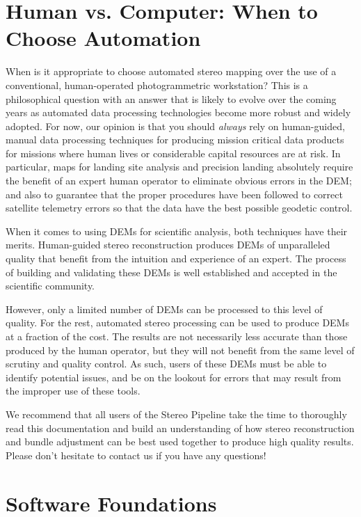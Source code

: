 \section{Human vs. Computer: When to Choose Automation}

When is it appropriate to choose automated stereo mapping over the use
of a conventional, human-operated photogrammetric workstation?  This
is a philosophical question with an answer that is likely to evolve
over the coming years as automated data processing technologies become
more robust and widely adopted.  For now, our opinion is that you
should {\em always} rely on human-guided, manual data processing
techniques for producing mission critical data products for missions
where human lives or considerable capital resources are at risk.  In
particular, maps for landing site analysis and precision landing
absolutely require the benefit of an expert human operator to
eliminate obvious errors in the \ac{DEM}; and also to guarantee that the
proper procedures have been followed to correct satellite telemetry
errors so that the data have the best possible geodetic control.

When it comes to using \acp{DEM} for scientific analysis, both techniques
have their merits.  Human-guided stereo reconstruction produces \acp{DEM}
of unparalleled quality that benefit from the intuition and experience
of an expert.  The process of building and validating these \acp{DEM} is
well established and accepted in the scientific community.

However, only a limited number of \acp{DEM} can be processed to this level
of quality.  For the rest, automated stereo processing can be used to
produce \acp{DEM} at a fraction of the cost.  The results are not
necessarily less accurate than those produced by the human operator,
but they will not benefit from the same level of scrutiny and quality
control.  As such, users of these \acp{DEM} must be able to identify
potential issues, and be on the lookout for errors that may result
from the improper use of these tools.

We recommend that all users of the Stereo Pipeline take the time to
thoroughly read this documentation and build an understanding of how
stereo reconstruction and bundle adjustment can be best used together to
produce high quality results.  Please don't hesitate to contact us if
you have any questions!

\section{Software Foundations}

